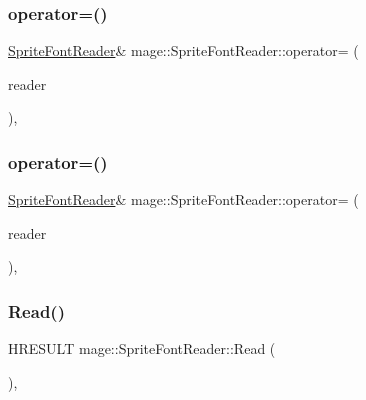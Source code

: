 \subsubsection{\texorpdfstring{operator=()}{operator=()}\hspace{0.1cm}{\footnotesize\ttfamily [1/2]}}
{\footnotesize\ttfamily \hyperlink{classmage_1_1_sprite_font_reader}{Sprite\+Font\+Reader}\& mage\+::\+Sprite\+Font\+Reader\+::operator= (\begin{DoxyParamCaption}\item[{const \hyperlink{classmage_1_1_sprite_font_reader}{Sprite\+Font\+Reader} \&}]{reader }\end{DoxyParamCaption})\hspace{0.3cm}{\ttfamily [private]}, {\ttfamily [delete]}}

\hypertarget{classmage_1_1_sprite_font_reader_aae3c6305ea97146bd85b2d93a037d47d}{}\label{classmage_1_1_sprite_font_reader_aae3c6305ea97146bd85b2d93a037d47d} 
\subsubsection{\texorpdfstring{operator=()}{operator=()}\hspace{0.1cm}{\footnotesize\ttfamily [2/2]}}
{\footnotesize\ttfamily \hyperlink{classmage_1_1_sprite_font_reader}{Sprite\+Font\+Reader}\& mage\+::\+Sprite\+Font\+Reader\+::operator= (\begin{DoxyParamCaption}\item[{\hyperlink{classmage_1_1_sprite_font_reader}{Sprite\+Font\+Reader} \&\&}]{reader }\end{DoxyParamCaption})\hspace{0.3cm}{\ttfamily [private]}, {\ttfamily [delete]}}

\hypertarget{classmage_1_1_sprite_font_reader_a6bc9fa71b4c9d884ba939d99f4c9c0d7}{}\label{classmage_1_1_sprite_font_reader_a6bc9fa71b4c9d884ba939d99f4c9c0d7} 
\subsubsection{\texorpdfstring{Read()}{Read()}}
{\footnotesize\ttfamily H\+R\+E\+S\+U\+LT mage\+::\+Sprite\+Font\+Reader\+::\+Read (\begin{DoxyParamCaption}{ }\end{DoxyParamCaption})\hspace{0.3cm}{\ttfamily [override]}, {\ttfamily [virtual]}}



